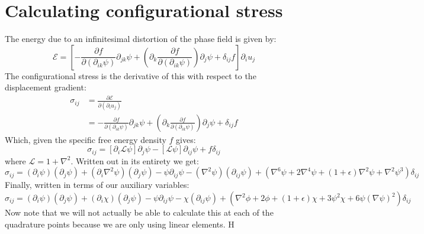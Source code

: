 \documentclass[reqno]{article}
\begin{document}
\section{Calculating configurational stress}
The energy due to an infinitesimal distortion of the phase field is given by:
\begin{equation}
    \mathcal{E}
    =
    \left[
        -\frac{\partial f}{\partial (\partial_{ik} \psi)} \partial_{jk} \psi
        + \left(\partial_k \frac{\partial f}{\partial (\partial_{ik}\psi)}\right) \partial_j \psi
        + \delta_{ij} f
    \right]
    \partial_i u_j
\end{equation}
The configurational stress is the derivative of this with respect to the displacement gradient:
\begin{equation}
    \begin{split}
        \sigma_{ij}
        &=
        \frac{\partial \mathcal{E}}{\partial (\partial_i u_j)} \\
        &=
        -\frac{\partial f}{\partial (\partial_{ik} \psi)} \partial_{jk} \psi
        + \left(\partial_k \frac{\partial f}{\partial (\partial_{ik}\psi)}\right) \partial_j \psi
        + \delta_{ij} f
    \end{split}
\end{equation}
Which, given the specific free energy density $f$ gives:
\begin{equation}
    \sigma_{ij}
    =
    \left[\partial_i \mathcal{L} \psi \right] \partial_j \psi
    - \left[ \mathcal{L} \psi \right] \partial_{ij} \psi
    + f \delta_{ij}
\end{equation}
where $\mathcal{L} = 1 + \nabla^2$.
Written out in its entirety we get:
\begin{equation}
    \sigma_{ij}
    =
    (\partial_i \psi) (\partial_j \psi)
    + (\partial_i \nabla^2 \psi) (\partial_j \psi)
    - \psi \partial_{ij} \psi
    - (\nabla^2 \psi) (\partial_{ij} \psi)
    + \left(\nabla^6 \psi + 2 \nabla^4 \psi + (1 + \epsilon) \nabla^2 \psi + \nabla^2 \psi^3\right)\delta_{ij}
\end{equation}
Finally, written in terms of our auxiliary variables:
\begin{equation}
    \sigma_{ij}
    =
    (\partial_i \psi) (\partial_j \psi)
    + (\partial_i \chi) (\partial_j \psi)
    - \psi \partial_{ij} \psi
    - \chi (\partial_{ij} \psi)
    + \left(\nabla^2 \phi + 2 \phi + (1 + \epsilon) \chi + 3\psi^2 \chi + 6 \psi \left(\nabla \psi\right)^2\right)\delta_{ij}
\end{equation}
Now note that we will not actually be able to calculate this at each of the quadrature points because we are only using linear elements.
H
\end{document}
